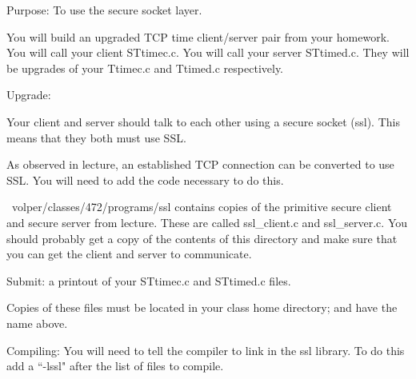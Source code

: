

\parindent 0pt

Purpose: To use the secure socket layer.

You will build an upgraded TCP time client/server pair
from your homework.
You will call your client {\ltt{}STtimec.c}.
You will call your server {\ltt{}STtimed.c}.
They will be upgrades of your {\ltt{}Ttimec.c} and {\ltt{}Ttimed.c}
respectively.

Upgrade:

Your client and server should talk to each other using a secure
socket (ssl).
This means that they both must use SSL.

As observed in lecture, an established TCP connection can be
converted to use SSL. You will need to add the code necessary to do this.

{\ltt{}~volper/classes/472/programs/ssl} contains copies
of the primitive secure client and secure server from lecture.
These are called {\ltt{}ssl_client.c} and {\ltt{}ssl_server.c}.
You should probably get a copy of the contents of this directory
and make sure that you can get the client and server to communicate.

Submit: a printout of your {\ltt{}STtimec.c} and {\ltt{}STtimed.c} files.

Copies of these files must be located in your class home directory;
and have the name above.

Compiling: You will need to tell the compiler to link in the ssl library.
To do this add a ``{\ltt{}-lssl}" after the list of files to compile.

\bye
